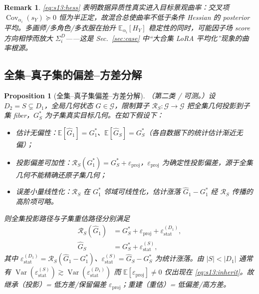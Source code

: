 \documentclass[11pt,a4paper]{article}
\newtheorem{proposition}[theorem]{Proposition}
\newtheorem{remark}[theorem]{Remark}
\DeclareMathOperator{\Cov}{Cov}
\DeclareMathOperator{\Var}{Var}
\newcommand{\E}{\mathbb{E}}
\newcommand{\cG}{\mathcal{G}}   %
\newcommand{\Rstr}{\mathcal{R}}     %
\begin{document}
\begin{remark}\label{rem:s13:curv}
\eqref{eq:s13:hess} 表明数据异质性\emph{真实进入}目标景观曲率：交叉项 $\Cov_{\alpha_i}(s_Y)\succeq 0$ 恒为半正定，故混合总使曲率不低于条件 Hessian 的 posterior 平均。多画师/多角色/多衣服在抬升 $\E_{\alpha_i}[H_Y]$ 稳定性的同时，可能因子场 score 方向相悖而放大 $\Sigma_i^D$——这是 Sec.~\ref{sec:case} 中“大合集 LoRA 平均化”现象的曲率根源。
\end{remark}

\subsection{全集--真子集的偏差--方差分解}

\begin{proposition}[全集--真子集偏差--方差分解]\label{prop:s13:biasvar}
（第二类 / 可测。）设 $D_2=S\subsetneq D_1$，全局几何状态 $G\in\cG$，限制算子 $\Rstr_S:\cG\to\cG$ 把全集几何投影到子集 fiber，$G_S^*$ 为子集真实目标几何。在如下假设下：
\begin{itemize}\setlength\itemsep{1pt}
\item[(A1)] \emph{估计无偏性}：$\E[\widehat{G}_1]=G_1^*$、$\E[\widehat{G}_S]=G_S^*$（各自数据下的统计估计渐近无偏）；
\item[(A2)] \emph{投影偏差可加性}：$\Rstr_S(G_1^*)=G_S^*+\varepsilon_{\mathrm{proj}}$，$\varepsilon_{\mathrm{proj}}$ 为确定性投影偏差，源于全集几何不能精确还原子集几何；
\item[(A3)] \emph{误差小量线性化}：$\Rstr_S$ 在 $G_1^*$ 邻域可线性化，估计涨落 $\widehat{G}_1-G_1^*$ 经 $\Rstr_S$ 传播的高阶项可略。
\end{itemize}
则全集投影路径与子集重估路径分别满足
\begin{align}
\Rstr_S(\widehat{G}_1)&=G_S^*+\varepsilon_{\mathrm{proj}}+\varepsilon_{\mathrm{stat}}^{(D_1)},\label{eq:s13:inherit}\\
\widehat{G}_S&=G_S^*+\varepsilon_{\mathrm{stat}}^{(S)},\label{eq:s13:rebuild}
\end{align}
其中 $\varepsilon_{\mathrm{stat}}^{(D_1)}=\Rstr_S(\widehat{G}_1-G_1^*)$、$\varepsilon_{\mathrm{stat}}^{(S)}=\widehat{G}_S-G_S^*$ 为统计涨落。由 $|S|<|D_1|$ 通常有 $\Var(\varepsilon_{\mathrm{stat}}^{(S)})\gtrsim\Var(\varepsilon_{\mathrm{stat}}^{(D_1)})$ 而 $\E[\varepsilon_{\mathrm{proj}}]\neq 0$ 仅出现在 \eqref{eq:s13:inherit}。故继承（投影）= 低方差/保留偏差 $\varepsilon_{\mathrm{proj}}$；重建（重估）= 低偏差/高方差。
\end{proposition}
\end{document}
